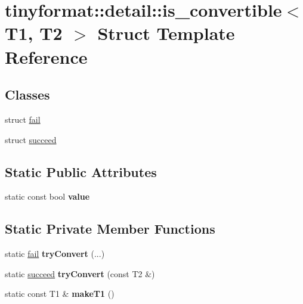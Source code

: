 \hypertarget{structtinyformat_1_1detail_1_1is__convertible}{}\section{tinyformat\+:\+:detail\+:\+:is\+\_\+convertible$<$ T1, T2 $>$ Struct Template Reference}
\label{structtinyformat_1_1detail_1_1is__convertible}
\subsection*{Classes}
\begin{DoxyCompactItemize}
\item 
struct \mbox{\hyperlink{structtinyformat_1_1detail_1_1is__convertible_1_1fail}{fail}}
\item 
struct \mbox{\hyperlink{structtinyformat_1_1detail_1_1is__convertible_1_1succeed}{succeed}}
\end{DoxyCompactItemize}
\subsection*{Static Public Attributes}
\begin{DoxyCompactItemize}
\item 
static const bool {\bfseries value}
\end{DoxyCompactItemize}
\subsection*{Static Private Member Functions}
\begin{DoxyCompactItemize}
\item 
\mbox{\label{structtinyformat_1_1detail_1_1is__convertible_a304a3fb17a674e61c688dd1219875870}} 
static \mbox{\hyperlink{structtinyformat_1_1detail_1_1is__convertible_1_1fail}{fail}} {\bfseries try\+Convert} (...)
\item 
\mbox{\label{structtinyformat_1_1detail_1_1is__convertible_ad75043563f9d33d477ca134c7d48d942}} 
static \mbox{\hyperlink{structtinyformat_1_1detail_1_1is__convertible_1_1succeed}{succeed}} {\bfseries try\+Convert} (const T2 \&)
\item 
\mbox{\label{structtinyformat_1_1detail_1_1is__convertible_af2068cf5629a702c9ccb3b8136c6fe2e}} 
static const T1 \& {\bfseries make\+T1} ()
\end{DoxyCompactItemize}


